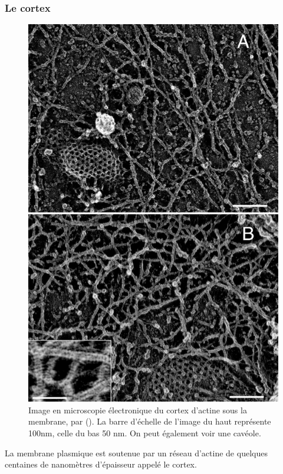 \subsubsection{Le cortex}

\begin{figure}
\includegraphics[scale=0.25]{Figures/cortex.png} 
\caption{Image en microscopie électronique du cortex d'actine sous la membrane, par (\cite{morone_three-dimensional_2006}). La barre d'échelle de l'image du haut représente 100nm, celle du bas 50 nm. On peut également voir une cavéole.}
\end{figure}

La membrane plasmique est soutenue par un réseau d'actine de quelques centaines de nanomètres d'épaisseur appelé le cortex.

